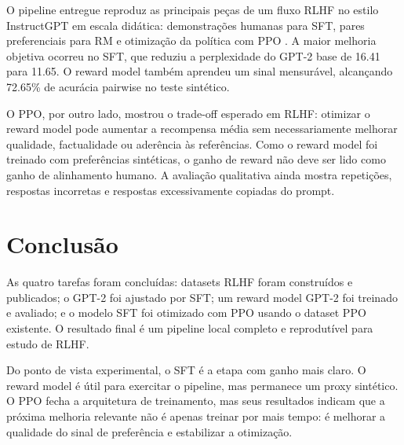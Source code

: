 \documentclass[a4paper,12pt]{article}
\begin{document}
O pipeline entregue reproduz as principais peças de um fluxo RLHF no estilo InstructGPT em escala didática: demonstrações humanas para SFT, pares preferenciais para RM e otimização da política com PPO \cite{ouyang2022training,schulman2017proximal}. A maior melhoria objetiva ocorreu no SFT, que reduziu a perplexidade do GPT-2 base de 16.41 para 11.65. O reward model também aprendeu um sinal mensurável, alcançando 72.65\% de acurácia pairwise no teste sintético.

O PPO, por outro lado, mostrou o trade-off esperado em RLHF: otimizar o reward model pode aumentar a recompensa média sem necessariamente melhorar qualidade, factualidade ou aderência às referências. Como o reward model foi treinado com preferências sintéticas, o ganho de reward não deve ser lido como ganho de alinhamento humano. A avaliação qualitativa ainda mostra repetições, respostas incorretas e respostas excessivamente copiadas do prompt.

\section{Conclusão}

As quatro tarefas foram concluídas: datasets RLHF foram construídos e publicados; o GPT-2 foi ajustado por SFT; um reward model GPT-2 foi treinado e avaliado; e o modelo SFT foi otimizado com PPO usando o dataset PPO existente. O resultado final é um pipeline local completo e reprodutível para estudo de RLHF.

Do ponto de vista experimental, o SFT é a etapa com ganho mais claro. O reward model é útil para exercitar o pipeline, mas permanece um proxy sintético. O PPO fecha a arquitetura de treinamento, mas seus resultados indicam que a próxima melhoria relevante não é apenas treinar por mais tempo: é melhorar a qualidade do sinal de preferência e estabilizar a otimização.




\end{document}
